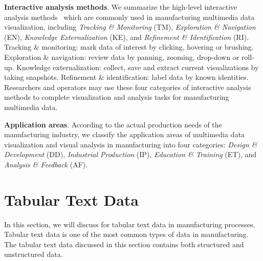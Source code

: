 \documentclass[a4paper,fleqn]{cas-dc}
\begin{document}
\textbf{Interactive analysis methods}. 
We summarize the high-level interactive analysis methods~\cite{yi2007toward} which are commonly used in manufacturing multimedia data visualization, including \textit{Tracking \& Monitoring} (TM), \textit{Exploration \& Navigation} (EN), \textit{Knowledge Externalization} (KE), and \textit{Refinement \& Identification} (RI).
Tracking \& monitoring: mark data of interest by clicking, hovering or brushing.
Exploration \& navigation: review data by panning, zooming, drop-down or roll-up.
Knowledge externalization: collect, save and extract current visualizations by taking snapshots.
Refinement \& identification: label data by known identities.
Researchers and operators may use these four categories of interactive analysis methods to complete visualization and analysis tasks for manufacturing multimedia data.

\textbf{Application areas}. 
According to the actual production needs of the manufacturing industry, we classify the application areas of multimedia data visualization and visual analysis in manufacturing into four categories: \textit{Design \& Development} (DD), \textit{Industrial Production} (IP), \textit{Education \& Training} (ET), and \textit{Analysis \& Feedback} (AF).

\section{Tabular Text Data}
In this section, we will discuss for tabular text data in manufacturing processes.
Tabular text data is one of the most common types of data in manufacturing. The tabular text data discussed in this section contains both structured and unstructured data.
\end{document}
